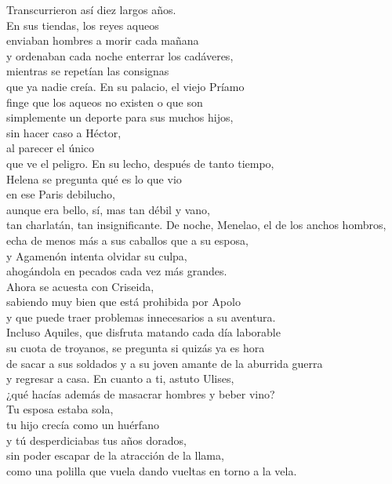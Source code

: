 \begin{versopropio}
Transcurrieron así diez largos años.\\
En sus tiendas, los reyes aqueos\\
enviaban hombres a morir cada mañana\\
y ordenaban cada noche enterrar los cadáveres,\\
mientras se repetían las consignas\\
que ya nadie creía.
\stanzabreak
En su palacio, el viejo Príamo\\
finge que los aqueos no existen o que son\\
simplemente un deporte para sus muchos hijos,\\
sin hacer caso a Héctor,\\
al parecer el único\\
que ve el peligro.
\stanzabreak
En su lecho, después de tanto tiempo,\\
Helena se pregunta qué es lo que vio\\
en ese Paris debilucho,\\
aunque era bello, sí, mas tan débil y vano,\\
tan charlatán, tan insignificante.
\stanzabreak
De noche, Menelao, el de los anchos hombros,\\
echa de menos más a sus caballos que a su esposa,\\
y Agamenón intenta olvidar su culpa,\\
ahogándola en pecados cada vez más grandes.\\
Ahora se acuesta con Criseida,\\
sabiendo muy bien que está prohibida por Apolo\\
y que puede traer problemas innecesarios a su aventura.\\
Incluso Aquiles, que disfruta matando cada día laborable\\
su cuota de troyanos, se pregunta si quizás ya es hora\\
de sacar a sus soldados y a su joven amante de la aburrida guerra\\
y regresar a casa.
\stanzabreak
En cuanto a ti, astuto Ulises,\\
¿qué hacías además de masacrar hombres y beber vino?\\
Tu esposa estaba sola,\\
tu hijo crecía como un huérfano\\
y tú desperdiciabas tus años dorados,\\
sin poder escapar de la atracción de la llama,\\
como una polilla que vuela dando vueltas en torno a la vela.
\end{versopropio}

